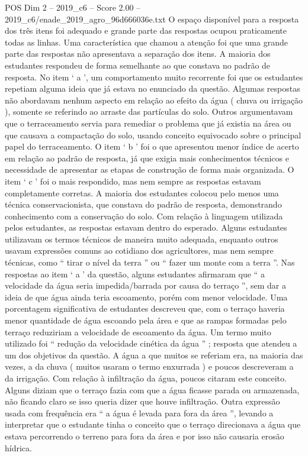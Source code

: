 \begin{textsample}{POS Dim 2 – 2019\_c6 – Score 2.00 – 2019\_c6/enade\_2019\_agro\_96d666036e.txt}
O espaço disponível para a resposta dos três itens foi adequado e grande parte das respostas ocupou praticamente todas as linhas.
Uma característica que chamou a atenção foi que uma grande parte das respostas não apresentava a separação dos itens.
A maioria dos estudantes respondeu de forma semelhante ao que constava no padrão de resposta.
No item ‘ a ’, um comportamento muito recorrente foi que os estudantes repetiam alguma ideia que já estava no enunciado da questão.
Algumas respostas não abordavam nenhum aspecto em relação ao efeito da água ( chuva ou irrigação ), somente se referindo ao arraste das partículas do solo.
Outros argumentavam que o terraceamento servia para remediar o problema que já existia na área ou que causava a compactação do solo, usando conceito equivocado sobre o principal papel do terraceamento.
O item ‘ b ’ foi o que apresentou menor índice de acerto em relação ao padrão de resposta, já que exigia mais conhecimentos técnicos e necessidade de apresentar as etapas de construção de forma mais organizada.
O item ‘ c ’ foi o mais respondido, mas nem sempre as respostas estavam completamente corretas.
A maioria dos estudantes colocou pelo menos uma técnica conservacionista, que constava do padrão de resposta, demonstrando conhecimento com a conservação do solo.
Com relação à linguagem utilizada pelos estudantes, as respostas estavam dentro do esperado.
Alguns estudantes utilizavam os termos técnicos de maneira muito adequada, enquanto outros usavam expressões comuns ao cotidiano dos agricultores, mas nem sempre técnicas, como “ tirar o nível da terra ” ou “ fazer um monte com a terra ”.
Nas respostas ao item ‘ a ’ da questão, alguns estudantes afirmaram que “ a velocidade da água seria impedida/barrada por causa do terraço ”, sem dar a ideia de que água ainda teria escoamento, porém com menor velocidade.
Uma porcentagem significativa de estudantes descreveu que, com o terraço haveria menor quantidade de água escoando pela área e que as rampas formadas pelo terraço reduziriam a velocidade de escoamento da água.
Um termo muito utilizado foi “ redução da velocidade cinética da água ” ; resposta que atendeu a um dos objetivos da questão.
A água a que muitos se referiam era, na maioria das vezes, a da chuva ( muitos usaram o termo enxurrada ) e poucos descreveram a da irrigação.
Com relação à infiltração da água, poucos citaram este conceito.
Alguns diziam que o terraço fazia com que a água ficasse parada ou armazenada, não ficando claro se isso queria dizer que houve infiltração.
Outra expressão usada com frequência era “ a água é levada para fora da área ”, levando a interpretar que o estudante tinha o conceito que o terraço direcionava a água que estava percorrendo o terreno para fora da área e por isso não causaria erosão hídrica.

\end{textsample}
